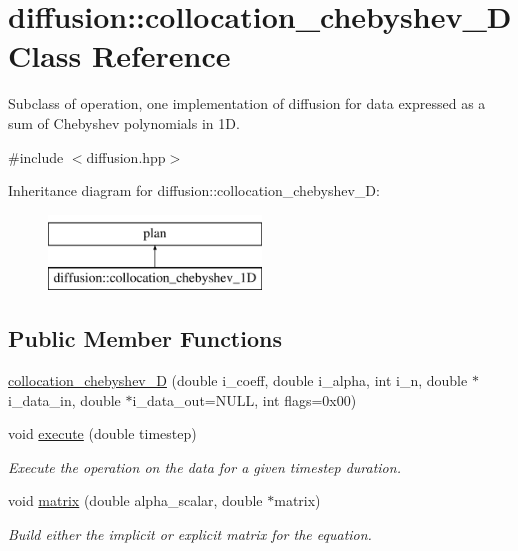 \hypertarget{classdiffusion_1_1collocation__chebyshev__1_d}{\section{diffusion\-:\-:collocation\-\_\-chebyshev\-\_\-D Class Reference}
\label{classdiffusion_1_1collocation__chebyshev__1_d}
}


Subclass of operation, one implementation of diffusion for data expressed as a sum of Chebyshev polynomials in 1\-D.  




{\ttfamily \#include $<$diffusion.\-hpp$>$}

Inheritance diagram for diffusion\-:\-:collocation\-\_\-chebyshev\-\_\-D\-:\begin{figure}[H]
\begin{center}
\leavevmode
\includegraphics[height=2.000000cm]{classdiffusion_1_1collocation__chebyshev__1_d}
\end{center}
\end{figure}
\subsection*{Public Member Functions}
\begin{DoxyCompactItemize}
\item 
\hyperlink{classdiffusion_1_1collocation__chebyshev__1_d_a0becc5880700ad836d87841e9b6a5d17}{collocation\-\_\-chebyshev\-\_\-D} (double i\-\_\-coeff, double i\-\_\-alpha, int i\-\_\-n, double $\ast$i\-\_\-data\-\_\-in, double $\ast$i\-\_\-data\-\_\-out=N\-U\-L\-L, int flags=0x00)
\item 
void \hyperlink{classdiffusion_1_1collocation__chebyshev__1_d_aeb08b7e12ff1a701eb432ef7aefd6926}{execute} (double timestep)
\begin{DoxyCompactList}\small\item\em Execute the operation on the data for a given timestep duration. \end{DoxyCompactList}\item 
void \hyperlink{classdiffusion_1_1collocation__chebyshev__1_d_aa1a54ebddb299868e4696dcce876572b}{matrix} (double alpha\-\_\-scalar, double $\ast$matrix)
\begin{DoxyCompactList}\small\item\em Build either the implicit or explicit matrix for the equation. \end{DoxyCompactList}\end{DoxyCompactItemize}



